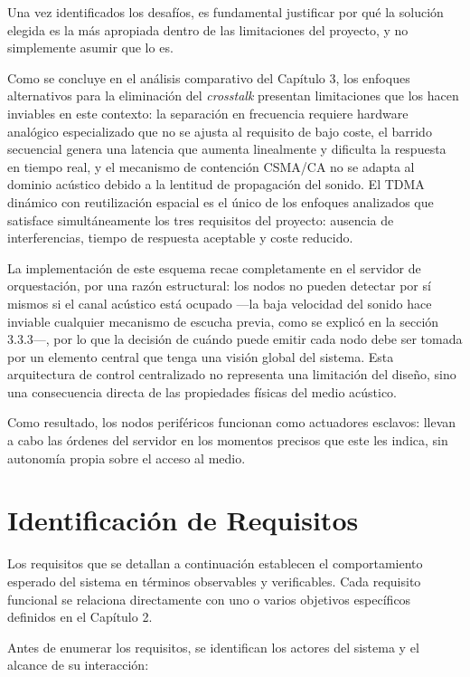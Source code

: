 Una vez identificados los desafíos, es fundamental justificar por qué la solución elegida es la más apropiada dentro de las limitaciones del proyecto, y no simplemente asumir que lo es.

Como se concluye en el análisis comparativo del Capítulo 3, los enfoques alternativos para la eliminación del \textit{crosstalk} presentan limitaciones que los hacen inviables en este contexto: la separación en frecuencia requiere hardware analógico especializado que no se ajusta al requisito de bajo coste, el barrido secuencial genera una latencia que aumenta linealmente y dificulta la respuesta en tiempo real, y el mecanismo de contención CSMA/CA no se adapta al dominio acústico debido a la lentitud de propagación del sonido. El TDMA dinámico con reutilización espacial es el único de los enfoques analizados que satisface simultáneamente los tres requisitos del proyecto: ausencia de interferencias, tiempo de respuesta aceptable y coste reducido.

La implementación de este esquema recae completamente en el servidor de orquestación, por una razón estructural: los nodos no pueden detectar por sí mismos si el canal acústico está ocupado —la baja velocidad del sonido hace inviable cualquier mecanismo de escucha previa, como se explicó en la sección 3.3.3—, por lo que la decisión de cuándo puede emitir cada nodo debe ser tomada por un elemento central que tenga una visión global del sistema. Esta arquitectura de control centralizado no representa una limitación del diseño, sino una consecuencia directa de las propiedades físicas del medio acústico.

Como resultado, los nodos periféricos funcionan como actuadores esclavos: llevan a cabo las órdenes del servidor en los momentos precisos que este les indica, sin autonomía propia sobre el acceso al medio.

\section{Identificación de Requisitos}

Los requisitos que se detallan a continuación establecen el comportamiento esperado del sistema en términos observables y verificables. Cada requisito funcional se relaciona directamente con uno o varios objetivos específicos definidos en el Capítulo 2.

Antes de enumerar los requisitos, se identifican los actores del sistema y el alcance de su interacción:

